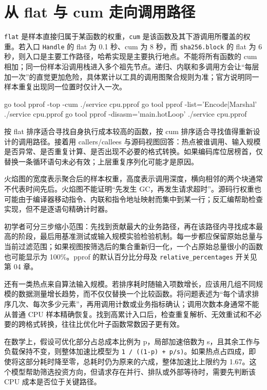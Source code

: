 \documentclass[UTF8,fontset=fandol,openany,11pt]{ctexbook}
\begin{document}
\section{从 flat 与 cum 走向调用路径}
\texttt{flat} 是样本直接归属于某函数的权重，\texttt{cum} 是该函数及其下游调用所覆盖的权重。若入口 \texttt{Handle} 的 flat 为 0.1 秒、cum 为 8 秒，而 \texttt{sha256.\allowbreak{}block} 的 flat 为 6 秒，则入口是主要工作路径，哈希实现是主要执行地点。不能将所有函数的 cum 相加；同一份样本沿调用栈进入多个祖先节点。递归、内联和多调用方会让“每层加一次”的直觉更加危险，具体累计以工具的调用图聚合规则为准；官方说明同一样本重复出现同一位置时仅计入一次。\cite{tools-pprof-cli}

\begin{codeblock}
go tool pprof -top -cum ./service cpu.pprof
go tool pprof -list='Encode|Marshal' ./service cpu.pprof
go tool pprof -disasm='main.hotLoop' ./service cpu.pprof
\end{codeblock}

按 flat 排序适合寻找自身执行成本较高的函数，按 cum 排序适合寻找值得重新设计的调用路径。接着用 callers/callees 与源码视图回答：热点被谁调用、输入规模是否异常、是否重复计算、是否出现不必要的格式转换。如果编码库位居榜首，仅替换一条循环语句未必有效；上层重复序列化可能才是原因。

火焰图的宽度表示聚合后的样本权重，高度表示调用深度，横向相邻的两个块通常不代表时间先后。火焰图不能证明“先发生 GC，再发生请求超时”。源码行权重也可能由于编译器移动指令、内联和指令地址映射而集中到某一行；反汇编帮助检查实现，但不是逐语句精确计时器。

初学者可分三步缩小范围：先找到贡献最大的业务路径，再在该路径内寻找成本最高的阶段，最后用基准测试或输入规模实验检验机制。每一步都应保留原始总量与当前过滤范围；如果视图按筛选后的集合重新归一化，一个占原始总量很小的函数也可能显示为 100\%。pprof 的默认百分比分母及 \texttt{relative\_\allowbreak{}percentages} 开关见第 04 章。

还有一类热点来自算法输入规模。若排序耗时随输入项数增长，应该用几组不同规模的数据测量增长趋势，而不仅仅替换一个比较函数。将问题表述为“每个请求排序几次、每次多少元素”，再用调用计数或业务指标确认；调用次数本身通常不能从普通 CPU 样本精确恢复。找到高累计入口后，检查重复解析、无效重试和不必要的跨格式转换，往往比优化叶子函数常数因子更有效。

在数学上，假设可优化部分占总成本比例为 p，局部加速倍数为 s，且其余工作与负载保持不变，则整体加速比模型为 \texttt{1 /\allowbreak{} ((1-\allowbreak{}p) + p/\allowbreak{}s)}。如果热点占四成，即使将这部分耗时降至零，总耗时仍为原来的六成，整体加速比上限约为 1.67。这个模型帮助筛选投资方向，但请求存在并行、排队或外部等待时，需要先判断该 CPU 成本是否位于关键路径。
\end{document}
